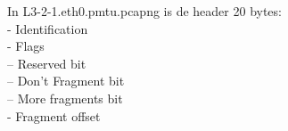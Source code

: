 In L3-2-1.eth0.pmtu.pcapng is de header 20 bytes:\\

- Identification\\

- Flags\\
-- Reserved bit\\
-- Don't Fragment bit\\
-- More fragments bit\\

- Fragment offset

